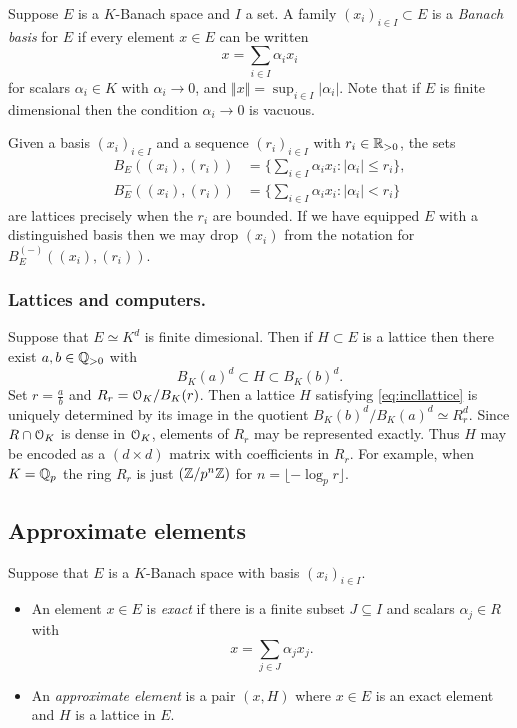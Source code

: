 \documentclass{lms}
\begin{document}
Suppose $E$ is a $K$-Banach space and $I$ a set.
A family $(x_i)_{i \in I} \subset E$ is a \emph{Banach basis} for $E$ if
every element $x \in E$ can be written
\[
x = \sum_{i \in I} \alpha_i x_i
\]
for scalars $\alpha_i \in K$ with $\alpha_i \to 0$, and $\Vert x \Vert = \sup_{i \in I} \lvert \alpha_i \rvert$.
Note that if $E$ is finite dimensional then the condition $\alpha_i \to 0$ is vacuous.

Given a basis $(x_i)_{i \in I}$ and a sequence $(r_i)_{i \in I}$ with $r_i \in \mathbb R_{>0}$, the sets
\begin{align*}
B_E((x_i),(r_i)) &= \Big\{ \sum_{i \in I} \alpha_i x_i : \lvert \alpha_i \rvert \le r_i \Big\}, \\
B^-_E((x_i),(r_i)) &= \Big\{ \sum_{i \in I} \alpha_i x_i : \lvert \alpha_i \rvert < r_i \Big\}
\end{align*}
are lattices precisely when the $r_i$ are bounded.  If we have equipped $E$ with a distinguished basis
then we may drop $(x_i)$ from the notation for $B^{(-)}_E((x_i),(r_i))$.

\subsubsection*{Lattices and computers.}

Suppose that $E \simeq K^d$ is finite dimesional.  Then if $H \subset E$
is a lattice then there exist $a, b \in \mathbb Q_{>0}$ with
\begin{equation}
\label{eq:incllattice}
B_K(a)^d \subset H \subset B_K(b)^d.
\end{equation}
Set $r = \frac a b$ and $R_r = \OK/B_K(r)$.  
Then a lattice $H$ satisfying \eqref{eq:incllattice} is uniquely 
determined by its image in the quotient $B_K(b)^d / B_K(a)^d \simeq 
R_r^d$.  Since $R \cap \OK$ is dense in $\OK$, elements of $R_r$ may be
represented exactly.  Thus $H$ may be encoded as a 
$(d \times d)$ matrix with coefficients in $R_r$.  For example, when
$K = \mathbb Q_p$ the ring $R_r$ is just $(\mathbb Z / p^n\mathbb Z)$ for $n = \lfloor - \log_p r \rfloor$.

\subsection{Approximate elements}

Suppose that $E$ is a $K$-Banach space with basis $(x_i)_{i \in I}$.
\begin{deftn}
\begin{itemize}
\item An element $x \in E$ is \emph{exact} if there is a finite subset $J \subseteq I$ and scalars $\alpha_j \in R$ with
\begin{equation} \label{eq:exact_elt}
x = \sum_{j \in J} \alpha_j x_j.
\end{equation}

\item An \emph{approximate element} is a pair $(x, H)$ where $x \in E$ is an exact element
and $H$ is a lattice in $E$.
\end{itemize}
\end{deftn}
\end{document}
